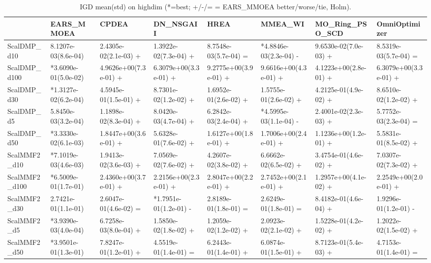 \begin{table}[t]
\centering
\caption{IGD mean(std) on highdim (*=best; +/-/= = EARS_MMOEA better/worse/tie, Holm).}
\label{tab:highdim_IGD}
\begin{tabular}{llllllll}
\toprule
 & EARS\_MMOEA & CPDEA & DN\_NSGAII & HREA & MMEA\_WI & MO\_Ring\_PSO\_SCD & OmniOptimizer \\
\midrule
ScalDMP\_d10 & 8.1207e-03(8.6e-04) & 2.4305e-02(2.1e-03) + & 1.3922e-02(7.3e-04) + & 8.7548e-03(5.7e-04) = & *4.8846e-03(2.3e-04) - & 9.6530e-02(7.0e-03) + & 8.5319e-03(5.7e-04) = \\
ScalDMP\_d100 & *3.6090e-01(5.0e-02) & 4.9626e+00(7.3e-01) + & 6.3079e+00(3.3e-01) + & 9.2775e+00(3.9e-01) + & 9.6616e+00(4.3e-01) + & 4.1223e+00(2.8e-01) + & 6.3079e+00(3.3e-01) + \\
ScalDMP\_d30 & *1.3127e-02(6.2e-04) & 4.5945e-01(1.5e-01) + & 8.7301e-02(1.2e-02) + & 1.6952e-01(2.6e-02) + & 1.5755e-01(2.6e-02) + & 4.2125e-01(4.9e-02) + & 8.6510e-02(1.2e-02) + \\
ScalDMP\_d5 & 5.8450e-03(3.2e-04) & 1.1898e-02(8.3e-04) + & 8.0420e-03(4.7e-04) + & 6.2842e-03(2.4e-04) + & *4.5995e-03(1.1e-04) - & 2.4001e-02(2.3e-03) + & 5.7752e-03(2.3e-04) = \\
ScalDMP\_d50 & *3.3330e-02(6.1e-03) & 1.8447e+00(3.6e-01) + & 5.6328e-01(7.6e-02) + & 1.6127e+00(1.8e-01) + & 1.7006e+00(2.4e-01) + & 1.1236e+00(1.2e-01) + & 5.5831e-01(8.5e-02) + \\
ScalMMF2\_d10 & *7.1019e-03(4.6e-03) & 1.9413e-02(3.6e-03) + & 7.0569e-02(7.6e-02) + & 4.2607e-02(3.8e-02) + & 6.6662e-02(6.5e-02) + & 3.4754e-01(4.6e-02) + & 7.0307e-02(7.3e-02) + \\
ScalMMF2\_d100 & *6.5009e-01(1.7e-01) & 2.4360e+00(3.7e-01) + & 2.2156e+00(2.3e-01) + & 2.8047e+00(2.2e-01) + & 2.7452e+00(2.1e-01) + & 1.2957e+00(4.1e-02) + & 2.2549e+00(2.0e-01) + \\
ScalMMF2\_d30 & 2.7421e-01(1.1e-01) & 2.6047e-01(4.6e-02) = & *1.7951e-01(1.2e-01) - & 2.8189e-01(1.8e-01) = & 2.6249e-01(1.8e-01) = & 8.4182e-01(4.6e-04) + & 1.9296e-01(1.2e-01) - \\
ScalMMF2\_d5 & *3.9390e-03(4.0e-04) & 6.7258e-03(8.0e-04) + & 1.5850e-02(1.8e-02) + & 1.2059e-02(1.2e-02) + & 2.0923e-02(2.1e-02) + & 1.5228e-01(4.2e-02) + & 1.2022e-02(1.5e-02) + \\
ScalMMF2\_d50 & *3.9501e-01(1.3e-01) & 7.8247e-01(1.2e-01) + & 4.5519e-01(1.4e-01) = & 6.2443e-01(1.4e-01) + & 6.0874e-01(1.5e-01) + & 8.7123e-01(5.4e-03) + & 4.7153e-01(1.4e-01) = \\
\bottomrule
\end{tabular}
\end{table}
